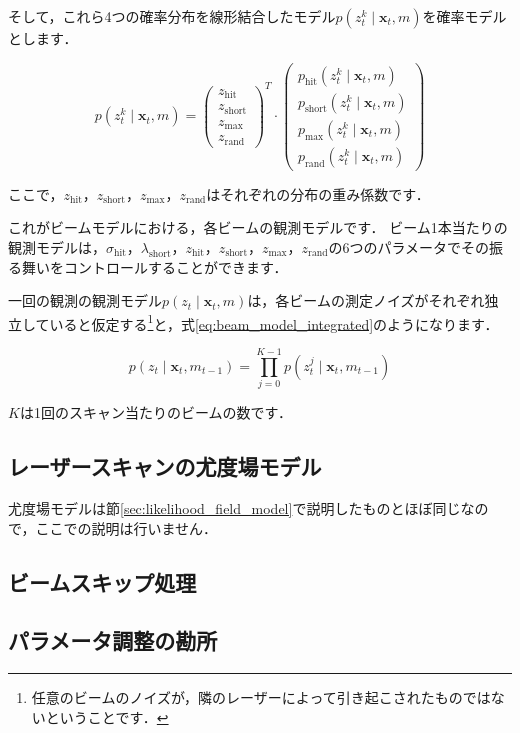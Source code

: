 \documentclass[{../../master}]{subfiles}
\begin{document}
そして，これら4つの確率分布を線形結合したモデル$p(z^{k}_{t} \mid \bm{x}_{t}, m)$を確率モデルとします．

\begin{equation}
  p(z^{k}_{t} \mid \bm{x}_{t}, m) =
  \begin{pmatrix}
    z_{\text{hit}} \\
    z_{\text{short}} \\
    z_{\text{max}} \\
    z_{\text{rand}}
  \end{pmatrix}^T
  \cdot
  \begin{pmatrix}
    p_{\text{hit}}(z^{k}_{t} \mid \bm{x}_{t}, m) \\
    p_{\text{short}}(z^{k}_{t} \mid \bm{x}_{t}, m) \\
    p_{\text{max}}(z^{k}_{t} \mid \bm{x}_{t}, m) \\
    p_{\text{rand}}(z^{k}_{t} \mid \bm{x}_{t}, m)
  \end{pmatrix}
  \label{eq:beam_model_p}
\end{equation}

ここで，$z_{\text{hit}}$，$z_{\text{short}}$，$z_{\text{max}}$，$z_{\text{rand}}$はそれぞれの分布の重み係数です．

これがビームモデルにおける，各ビームの観測モデルです．
ビーム1本当たりの観測モデルは，$\sigma_{\text{hit}}$，$\lambda_{\text{short}}$，$z_{\text{hit}}$，$z_{\text{short}}$，$z_{\text{max}}$，$z_{\text{rand}}$の6つのパラメータでその振る舞いをコントロールすることができます．

一回の観測の観測モデル$p(z_{t} \mid \bm{x}_{t}, m)$は，各ビームの測定ノイズがそれぞれ独立していると仮定する\footnote{任意のビームのノイズが，隣のレーザーによって引き起こされたものではないということです．}と，式\ref{eq:beam_model_integrated}のようになります．

\begin{equation}
  p(z_{t} \mid \bm{x}_{t}, m_{t-1}) = \prod_{j=0}^{K-1} p(z_{t}^{j} \mid \bm{x}_{t}, m_{t-1})
  \label{eq:beam_model_integrated}
\end{equation}

$K$は1回のスキャン当たりのビームの数です．

\subsection{レーザースキャンの尤度場モデル}

尤度場モデルは節\ref{sec:likelihood_field_model}で説明したものとほぼ同じなので，ここでの説明は行いません．

\subsection{ビームスキップ処理}

\subsection{パラメータ調整の勘所}
\end{document}
